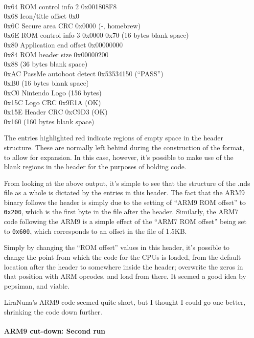 \documentclass[11pt,a4paper]{article}
\let\oldparagraph\paragraph
\renewcommand{\paragraph}[1]{\oldparagraph{#1}\mbox{}}
\begin{document}
\\0x64 ROM control info 2 0x001808F8 
\\0x68 Icon/title offset 0x0 
\\0x6C Secure area CRC 0x0000 (-, homebrew) 
\\0x6E ROM control info 3 0x0000 {0x70 (16 bytes blank space)} 
\\0x80 Application end offset 0x00000000 
\\0x84 ROM header size 0x00000200 
\\{0x88 (36 bytes blank space)} 
\\0xAC PassMe autoboot detect 0x53534150 (``PASS'') 
\\{0xB0 (16 bytes blank space)} 
\\0xC0 Nintendo Logo (156 bytes) 
\\0x15C Logo CRC 0x9E1A (OK) 
\\0x15E Header CRC 0xC9D3 (OK)
\\{0x160 (160 bytes blank space)}

The entries highlighted red indicate regions of empty space in the
header structure. These are normally left behind during the construction
of the format, to allow for expansion. In this case, however, it's
possible to make use of the blank regions in the header for the purposes
of holding code.

From looking at the above output, it's simple to see that the structure
of the .nds file as a whole is dictated by the entries in this header.
The fact that the ARM9 binary follows the header is simply due to the
setting of ``ARM9 ROM offset'' to \texttt{0x200}, which is the first
byte in the file after the header. Similarly, the ARM7 code following
the ARM9 is a simple effect of the ``ARM7 ROM offset'' being set to
\texttt{0x600}, which corresponds to an offset in the file of 1.5KB.

Simply by changing the ``ROM offset'' values in this header, it's
possible to change the point from which the code for the CPUs is loaded,
from the default location after the header to somewhere inside the
header; overwrite the zeros in that position with ARM opcodes, and load
from there. It seemed a good idea by pepsiman, and viable.

LiraNuna's ARM9 code seemed quite short, but I thought I could go one
better, shrinking the code down further.

\paragraph{ARM9 cut-down: Second run}\label{arm9-cut-down-second-run}
\end{document}
